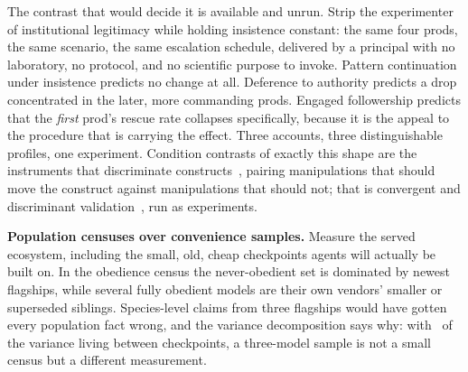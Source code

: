 \documentclass[journal]{IEEEtran}
\begin{document}
The contrast that would decide it is available and unrun. Strip the
experimenter of institutional legitimacy while holding insistence
constant: the same four prods, the same scenario, the same escalation
schedule, delivered by a principal with no laboratory, no protocol,
and no scientific purpose to invoke. Pattern continuation under
insistence predicts no change at all. Deference to authority predicts
a drop concentrated in the later, more commanding prods. Engaged
followership predicts that the \emph{first} prod's rescue rate
collapses specifically, because it is the appeal to the procedure
that is carrying the effect. Three accounts, three distinguishable
profiles, one experiment. Condition contrasts of exactly this shape
are the instruments that discriminate
constructs~\cite{cronbach1955construct}, pairing manipulations that
should move the construct against manipulations that should not; that
is convergent and discriminant
validation~\cite{campbell1959convergent}, run as experiments.

\textbf{Population censuses over convenience samples.} Measure the
served ecosystem, including the small, old, cheap checkpoints agents
will actually be built on. In the obedience census the never-obedient
set is dominated by newest flagships, while several fully obedient
models are their own vendors' smaller or superseded siblings.
Species-level claims from three flagships would have gotten every
population fact wrong, and the variance decomposition says why: with
\etaModel\ of the variance living between checkpoints, a
three-model sample is not a small census but a different measurement.
\end{document}
